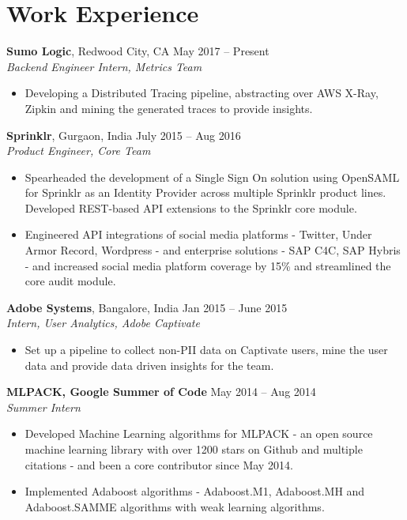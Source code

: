 \documentclass[letterpaper]{article}
\begin{document}
\section*{Work Experience}
\textbf{Sumo Logic}, Redwood City, CA \hfill May 2017 -- Present\\
\emph{Backend Engineer Intern, Metrics Team}\\
\vspace{-6mm}
\begin{itemize}
\item Developing a Distributed Tracing pipeline, abstracting over AWS X-Ray, Zipkin and mining the generated traces to provide insights.
\end{itemize}
\vspace{-1mm}
\textbf{Sprinklr}, Gurgaon, India \hfill July 2015 -- Aug 2016\\
\emph{Product Engineer, Core Team}\\
\vspace{-6mm}
\begin{itemize}
\item Spearheaded the development of a Single Sign On solution using OpenSAML for Sprinklr as an Identity Provider  across multiple Sprinklr product lines. Developed REST-based API extensions to the Sprinklr core module.
\vspace{-2mm}
\item Engineered API integrations of social media platforms - Twitter, Under Armor Record, Wordpress - and enterprise solutions - SAP C4C, SAP Hybris - and increased social media platform coverage by 15\% and streamlined the core audit module.
\end{itemize}

\vspace{-0.5mm}
\textbf{Adobe Systems}, Bangalore, India \hfill Jan 2015 -- June 2015\\
\emph{Intern, User Analytics, Adobe Captivate}\\
\vspace{-6mm}
\begin{itemize}
\item Set up a pipeline to collect non-PII data on Captivate users, mine the user data and provide data driven insights for the team.
\end{itemize}

\vspace{-0.6mm}

\textbf{MLPACK, Google Summer of Code} \hfill May 2014 -- Aug 2014\\
\emph{Summer Intern}\\
\vspace{-6mm}
\begin{itemize}
\item Developed Machine Learning algorithms for MLPACK - an open source machine learning library with over 1200 stars on Github and multiple citations - and been a core contributor since May 2014.
\vspace{-2mm}
\item Implemented Adaboost algorithms - Adaboost.M1, Adaboost.MH and Adaboost.SAMME algorithms with weak learning algorithms.
\end{itemize}
\vspace{-1mm}
\end{document}
